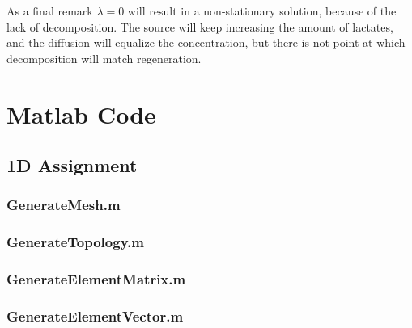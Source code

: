\documentclass[10pt,a4paper]{article}
\begin{document}
As a final remark $\lambda=0$ will result in a non-stationary solution, because of the lack of decomposition. The source will keep increasing the amount of lactates, and the diffusion will equalize the concentration, but there is not point at which decomposition will match regeneration. 

\newpage
\section{Matlab Code}

\subsection{1D Assignment}
\lstset{inputpath=./Functions/1D}

\subsubsection{GenerateMesh.m}


\subsubsection{GenerateTopology.m}


\subsubsection{GenerateElementMatrix.m}


\subsubsection{GenerateElementVector.m}

\end{document}
